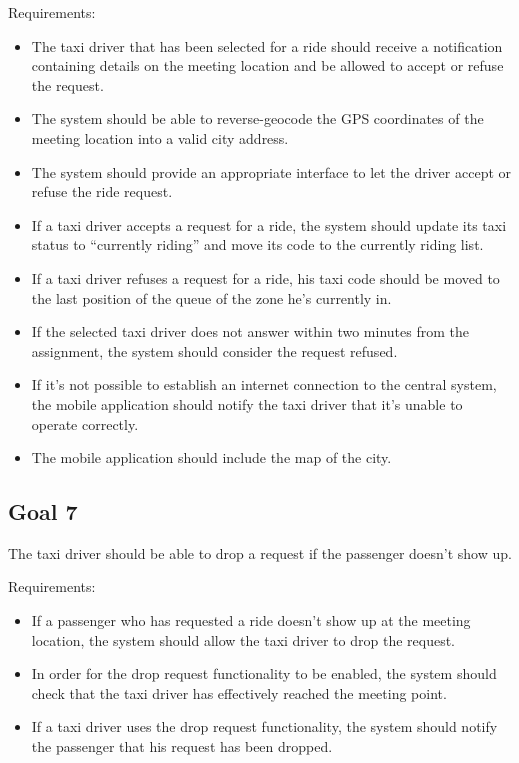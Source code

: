 Requirements:
\begin{itemize}
\item The taxi driver that has been selected for a ride should receive a notification containing details on the meeting location and be allowed to accept or refuse the request.
\item The system should be able to reverse-geocode the GPS coordinates of the meeting location into a valid city address.
\item The system should provide an appropriate interface to let the driver accept or refuse the ride request.
\item If a taxi driver accepts a request for a ride, the system should update its taxi status to ``currently riding'' and move its code to the currently riding list.
\item If a taxi driver refuses a request for a ride, his taxi code should be moved to the last position of the queue of the zone he's currently in.
\item If the selected taxi driver does not answer within two minutes from the assignment, the system should consider the request refused. 
\item If it's not possible to establish an internet connection to the central system, the mobile application should notify the taxi driver that it's unable to operate correctly.
\item The mobile application should include the map of the city.
\end{itemize}


\subsection{Goal 7}
The taxi driver should be able to drop a request if the passenger doesn't show up.

Requirements:
\begin{itemize}
\item If a passenger who has requested a ride doesn't show up at the meeting location, the system should allow the taxi driver to drop the request. 
\item In order for the drop request functionality to be enabled, the system should check that the taxi driver has effectively reached the meeting point.
\item If a taxi driver uses the drop request functionality, the system should notify the passenger that his request has been dropped.
\end{itemize}


